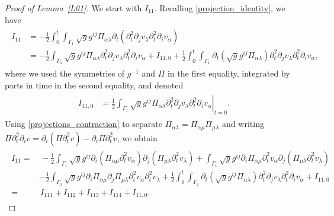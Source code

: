 \documentclass[10pt,reqno]{amsart}
\makeatletter
\theoremstyle{plain}
\theoremstyle{definition}
\numberwithin{equation}{section}
\newcommand{\al}{\alpha}
\newcommand{\Ga}{\Gamma}
\newcommand{\la}{\lambda}
\def\paragraph{\@startsection{paragraph}{4}%
  \z@\z@{-\fontdimen2\font}%
  {\normalfont\it}}
\makeatother
\begin{document}
\begin{proof}[Proof of Lemma~\ref{L01}]
We start with
$I_{11}$.
Recalling \eqref{projection_identity}, we have
\begin{align}
\begin{split}
I_{11} & =
- \frac{1}{2}\int_0^t \int_{\Ga_1}
\sqrt{g} g^{ij}\Pi_{\al\la} \partial_t (\partial^2_t \partial_j v_\la \partial^2_t \partial_i v_\al)
\\
& = 
-\frac{1}{2} \int_{\Ga_1} 
\sqrt{g} g^{ij}\Pi_{\al\la} \partial^2_t \partial_j v_\la \partial^2_t \partial_i v_\al
+ I_{11,0} 
 + \frac{1}{2}
\int_0^t \int_{\Ga_1}
\partial_t(\sqrt{g} g^{ij}\Pi_{\al\la} ) \partial^2_t \partial_j v_\la \partial^2_t \partial_i v_\al,
\end{split}
\nonumber
\end{align}
where we used the symmetries of $g^{-1}$ and  $\Pi$ in the first equality, integrated
by parts in time in the second equality, and denoted
\begin{align}
\begin{split}
I_{11,0}
&
=
\left.
\frac{1}{2} \int_{\Ga_1} 
\sqrt{g} g^{ij}\Pi_{\al\la} \partial^2_t \partial_j v_\la \partial^2_t \partial_i v_\al
\right|_{t=0}.
\end{split}
\nonumber
\end{align}
Using \eqref{projections_contraction} 
to separate
$\Pi_{\alpha\lambda}=\Pi_{\alpha\mu}\Pi_{\mu\lambda}$
and writing 
$
\Pi \partial^2_t \partial_i v = \partial_i(\Pi \partial^2_t v) - \partial_i\Pi \partial^2_t v
$,
we obtain
\begin{align}
\begin{split}
I_{11}  = & \,
-\frac{1}{2} \int_{\Ga_1} 
\sqrt{g} g^{ij}\partial_i (\Pi_{\al\mu} \partial^2_t v_\al) \partial_j (\Pi_{\mu\la}  \partial^2_tv_\la)
+ \int_{\Ga_1} \sqrt{g} g^{ij} \partial_i \Pi_{\al\mu} \partial^2_t v_\al \partial_j
(\Pi_{\mu\la} \partial^2_t v_\la )
\\
& -\frac{1}{2} \int_{\Ga_1} \sqrt{g} g^{ij}\partial_i \Pi_{\al\mu} \partial_j \Pi_{\mu\la} \partial^2_t v_\al 
\partial^2_t v_\la 
 + \frac{1}{2}
\int_0^t \int_{\Ga_1}
\partial_t(\sqrt{g} g^{ij}\Pi_{\al\la}) \partial^2_t \partial_j v_\la \partial^2_t \partial_i v_\al 
+  I_{11,0} 
\\
= & \, I_{111} + I_{112} + I_{113} + I_{114} + I_{11,0}.
\end{split}
\nonumber
\end{align}

\end{proof}
\end{document}
